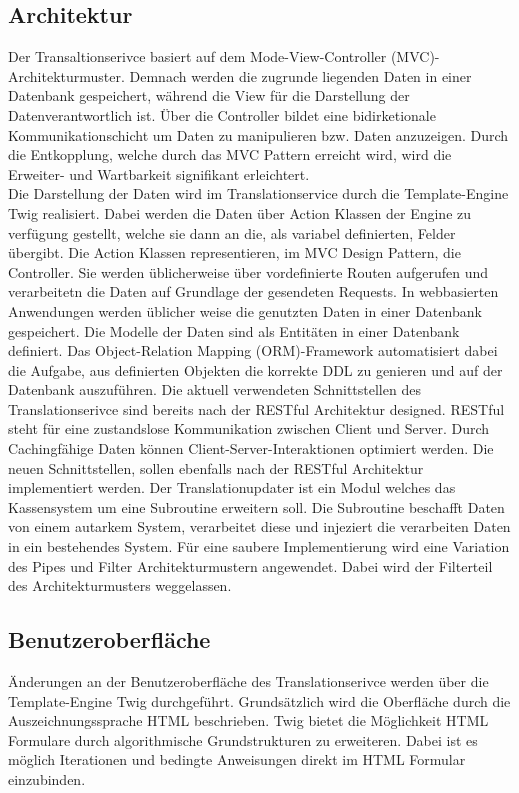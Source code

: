 \documentclass[10pt, oneside]{article}
\begin{document}
    \subsection{Architektur}\label{sec:architecture}%
      Der Transaltionserivce basiert auf dem Mode-View-Controller (MVC)-Architekturmuster. Demnach werden die zugrunde liegenden Daten in einer Datenbank gespeichert, während die View für
      die Darstellung der Datenverantwortlich ist. Über die Controller bildet eine bidirketionale Kommunikationschicht um Daten zu manipulieren bzw. Daten anzuzeigen.
      Durch die Entkopplung, welche durch das MVC Pattern erreicht wird, wird die Erweiter- und Wartbarkeit signifikant erleichtert.\\
      Die Darstellung der Daten wird im Translationservice durch die Template-Engine Twig realisiert. Dabei werden die Daten über Action Klassen der Engine zu verfügung gestellt,
      welche sie dann an die, als variabel definierten, Felder übergibt. Die Action Klassen representieren, im MVC Design Pattern, die Controller. Sie werden üblicherweise über 
      vordefinierte Routen aufgerufen und verarbeitetn die Daten auf Grundlage der gesendeten Requests. 
      In webbasierten Anwendungen werden üblicher weise die genutzten Daten in einer Datenbank gespeichert. Die Modelle der Daten sind als Entitäten in einer Datenbank definiert.
      Das Object-Relation Mapping (ORM)-Framework automatisiert dabei die Aufgabe, aus definierten Objekten die korrekte DDL zu genieren und auf der Datenbank auszuführen. 
      Die aktuell verwendeten Schnittstellen des Translationserivce sind bereits nach der RESTful Architektur designed. RESTful steht für eine zustandslose 
      Kommunikation zwischen Client und Server. Durch Cachingfähige Daten können Client-Server-Interaktionen optimiert werden. 
      Die neuen Schnittstellen, sollen ebenfalls nach der RESTful Architektur implementiert werden.  
      Der Translationupdater ist ein Modul welches das Kassensystem um eine Subroutine erweitern soll. Die Subroutine beschafft Daten von einem autarkem System, verarbeitet diese 
      und injeziert die verarbeiten Daten in ein bestehendes System. Für eine saubere Implementierung wird eine Variation des Pipes und Filter Architekturmustern angewendet. 
      Dabei wird der Filterteil des Architekturmusters weggelassen.
    \newpage
    \subsection{Benutzeroberfläche}\label{sec:dr:ui}
    Änderungen an der Benutzeroberfläche des Translationserivce werden über die Template-Engine Twig durchgeführt. Grundsätzlich wird die Oberfläche durch die Auszeichnungssprache HTML beschrieben. Twig bietet die Möglichkeit
    HTML Formulare durch algorithmische Grundstrukturen zu erweiteren. Dabei ist es möglich Iterationen und bedingte Anweisungen direkt im HTML Formular einzubinden.
\end{document}
